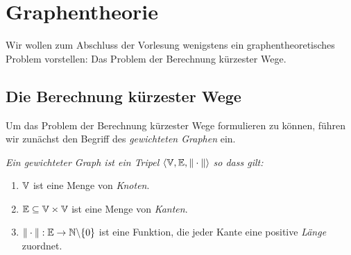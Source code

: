\chapter{Graphentheorie}
Wir wollen zum Abschluss der Vorlesung wenigstens ein graphentheoretisches Problem
vorstellen: Das Problem der Berechnung  k\"urzester Wege. 


\section{Die Berechnung k\"urzester Wege}
Um das Problem der Berechnung k\"urzester Wege formulieren zu k\"onnen, f\"uhren wir zun\"achst 
den Begriff des \emph{gewichteten Graphen} ein.  

\begin{Definition}
{\em
  Ein  {\em gewichteter Graph} ist ein Tripel
   $\langle {\mathbb V}, {\mathbb E}, \|\cdot\| \rangle$ so dass gilt:
  \begin{enumerate}
  \item ${\mathbb V}$ ist eine Menge von \emph{Knoten}.
  \item ${\mathbb E} \subseteq {\mathbb V} \times {\mathbb V}$ ist eine Menge von \emph{Kanten}.
  \item $\|\cdot\|: {\mathbb E} \rightarrow {\mathbb N} \backslash\{0\}$ ist eine Funktion,
        die jeder Kante eine positive \emph{L\"ange} zuordnet.
        \conclude
  \end{enumerate}
}
\end{Definition}

